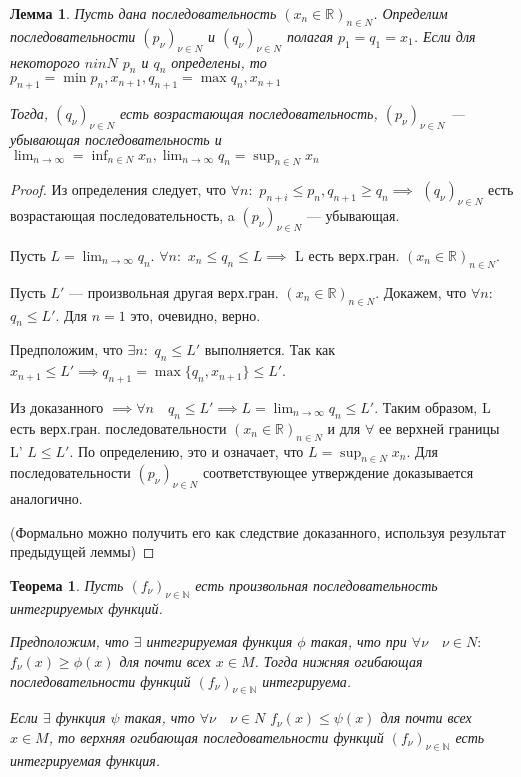 \documentclass[a4paper]{article}
\newtheorem{theorem}{Теорема}[section]
\newtheorem{lemma}{Лемма}[section]
\theoremstyle{definition}
\theoremstyle{remark}
\begin{document}
     \begin{lemma}
          Пусть дана последовательность $(x_n \in \mathbb{R})_{n\in N}$.  
          Определим последовательности $(p_\nu)_{\nu \in N}$ и 
          $(q_\nu)_{\nu \in N}$ полагая 
          $p_1 = q_1 = x_1$. Если для некоторого $n in N$ $p_n$ и $q_n$ определены, 
          то $p_{n+1} = \min{p_n,x_{n+1}}, q_{n+1} = \max{q_n, x_{n+1}}$
          
          Тогда, $(q_\nu)_{\nu \in N}$ есть 
          возрастающая последовательность, $(p_\nu)_{\nu \in N}$ — убывающая  
          последовательность и 
          $\lim_{n\to \infty} = \inf_{n\in N}x_n, \lim_{n\to \infty}q_n = \sup_{n\in N} x_n$
     \end{lemma}
     \begin{proof}
          Из определения следует, что $\forall n:$ $p_{n+i} \leq p_n, q_{n+1} \geq q_n\implies$
          $(q_\nu)_{\nu \in N}$ есть возрастающая последовательность, a $(p_\nu)_{\nu \in N}$ —  
          убывающая. 
          
          Пусть $L = \lim_{n\to \infty}q_n$. $\forall n:$ $x_n \leq q_n \leq L\implies$ 
          L есть верх.гран. $(x_n \in \mathbb{R})_{n\in N}$.

          Пусть $L'$ — произвольная другая верх.гран. $(x_n \in \mathbb{R})_{n\in N}$. 
          Докажем, что $\forall n:$ $q_n \leq L'$. Для 
          $n = 1$ это, очевидно, верно. 

          Предположим, что $\exists n:$ $q_n \leq L'$  
          выполняется. Так как $x_{n+1} \leq L' \implies q_{n+1} = \max\{q_n, x_{n+1}\}\leq L'$. 
          
          Из доказанного $\implies \forall n\quad q_n \leq L' \implies L = \lim_{n\to \infty}q_n\leq L'$. Таким образом, L есть верх.гран. 
          последовательности $(x_n \in \mathbb{R})_{n\in N}$ и для $\forall$ ее верхней границы L' $L \leq L'$. По определению, это и означает, что 
          $L = \sup_{n\in N}x_n$. Для последовательности $(p_\nu)_{\nu \in N}$ соответствующее 
          утверждение доказывается аналогично. 

          (Формально можно получить его как 
          следствие доказанного, используя результат предыдущей леммы)
     \end{proof}
     \begin{theorem}
          Пусть $(f_\nu)_{\nu\in \mathbb{N}}$ есть произвольная  
          последовательность интегрируемых функций.
           
          Предположим, что $\exists$
          интегрируемая функция $\phi$ такая, что при $\forall \nu \quad \nu \in N: \quad$
          $f_\nu(x)\geq \phi(x)$ для почти всех $x \in M$. Тогда нижняя огибающая  
          последовательности функций $(f_\nu)_{\nu\in \mathbb{N}}$ интегрируема. 
          
          Если $\exists$  
          функция $\psi$ такая, что $\forall \nu \quad \nu \in N$ $f_\nu(x) \leq \psi(x)$ для 
          почти всех $x \in M$, то верхняя огибающая последовательности функций 
          $(f_\nu)_{\nu\in \mathbb{N}}$ есть интегрируемая функция. 
     \end{theorem}
\end{document}
